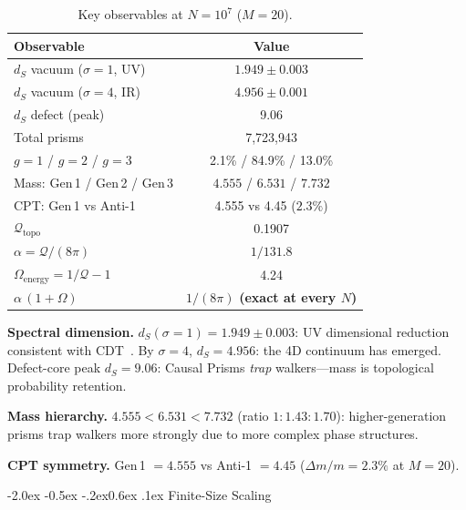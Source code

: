 \documentclass[aps,prl,twocolumn,superscriptaddress,nofootinbib,amsmath,amssymb,floatfix]{revtex4-2}
\makeatletter
\def\sec@upcase#1{\uppercase{#1}}
\renewcommand\section{\@startsection{section}{1}{\z@}%
  {-2.0ex \@plus -0.5ex \@minus -.2ex}{0.6ex \@plus .1ex}%
  {\normalfont\small\bfseries\centering\sec@upcase}}
\makeatother
\begin{document}
\begin{table}[H]
\caption{Key observables at $N = 10^7$ ($M = 20$).}
\label{tab:results}
\setlength{\tabcolsep}{4pt}
\begin{tabular}{@{}lc@{}}
\toprule
\textbf{Observable} & \textbf{Value} \\
\midrule
$d_S$ vacuum ($\sigma{=}1$, UV) & $1.949 \pm 0.003$ \\
$d_S$ vacuum ($\sigma{=}4$, IR) & $4.956 \pm 0.001$ \\
$d_S$ defect (peak)             & 9.06 \\
\midrule
Total prisms                    & 7{,}723{,}943 \\
$g{=}1$ / $g{=}2$ / $g{=}3$    & 2.1\% / 84.9\% / 13.0\% \\
Mass: Gen\,1 / Gen\,2 / Gen\,3 & $4.555$ / $6.531$ / $7.732$ \\
CPT: Gen\,1 vs Anti-1           & 4.555 vs 4.45 ($2.3\%$) \\
$\mathcal{Q}_{\mathrm{topo}}$  & 0.1907 \\
$\alpha = \mathcal{Q}/(8\pi)$  & $1/131.8$ \\
$\Omega_{\mathrm{energy}} = 1/\mathcal{Q} - 1$ & 4.24 \\
$\alpha\,(1 + \Omega)$         & $1/(8\pi)$ \textbf{(exact at every $N$)} \\
\bottomrule
\end{tabular}
\end{table}

\textbf{Spectral dimension.}
$d_S(\sigma{=}1) = 1.949 \pm 0.003$: UV dimensional reduction consistent
with CDT~\cite{ambjorn2005,carlip2017}.
By $\sigma = 4$, $d_S = 4.956$: the 4D continuum has emerged.
Defect-core peak $d_S = 9.06$: Causal Prisms \emph{trap} walkers---mass
is topological probability retention.

\textbf{Mass hierarchy.}
$4.555 < 6.531 < 7.732$ (ratio $1 : 1.43 : 1.70$): higher-generation prisms
trap walkers more strongly due to more complex phase structures.

\textbf{CPT symmetry.}
Gen\,1 $= 4.555$ vs Anti-1 $= 4.45$ ($\Delta m/m = 2.3\%$
at $M{=}20$).

\section{Finite-Size Scaling}\label{sec:fss}
\end{document}
